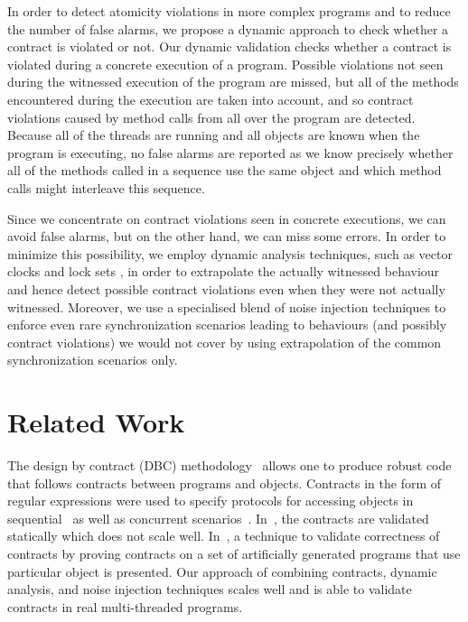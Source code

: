 \documentclass[runningheads]{llncs}
\begin{document}
In order to detect atomicity violations in more complex programs and to reduce
the number of false alarms, we propose a dynamic approach to check whether a
contract is violated or not. Our dynamic validation checks whether a contract is
violated during a concrete execution of a program. Possible violations not seen
during the witnessed execution of the program are missed, but all of the methods
encountered during the execution are taken into account, and so contract
violations caused by method calls from all over the program are detected.
Because all of the threads are running and all objects are known when the
program is executing, no false alarms are reported as we know precisely whether
all of the methods called in a sequence use the same object and which method
calls might interleave this sequence. 

Since we concentrate on contract violations seen in concrete executions, we can
avoid false alarms, but on the other hand, we can miss some errors. In order to
minimize this possibility, we employ dynamic analysis techniques, such as vector
clocks and lock sets \cite{velodrome08}, in order to extrapolate the actually
witnessed behaviour and hence detect possible contract violations even when they
were not actually witnessed.  Moreover, we use a specialised blend of noise
injection techniques \cite{noise14} to enforce even rare synchronization
scenarios leading to behaviours (and possibly contract violations) we would not
cover by using extrapolation of the common synchronization scenarios only.

\vspace*{-2mm}\section{Related Work}\vspace*{-1.5mm}

The design by contract (DBC) methodology~\cite{contracts92} allows one to
produce robust code that follows contracts between programs and objects.
Contracts in the form of regular expressions were used to specify protocols for
accessing objects in sequential~\cite{Cheon07} as well as concurrent
scenarios~\cite{Hurlin09,contract13,tr:2014:d_sousa}.
In~\cite{tr:2014:d_sousa,contract13}, the contracts are validated statically
which does not scale well. In~\cite{Hurlin09}, a technique to validate
correctness of contracts by proving contracts on a set of artificially generated
programs that use particular object is presented. Our approach of combining
contracts, dynamic analysis, and noise injection techniques scales well and is
able to validate contracts in real multi-threaded programs.
\end{document}
